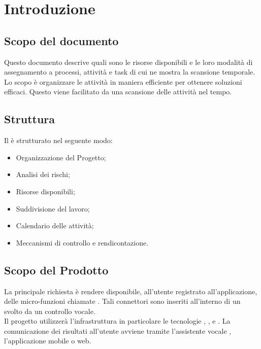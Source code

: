 \justify
\section{Introduzione}

\subsection{Scopo del documento}
Questo documento descrive quali sono le risorse disponibili e le loro modalità di assegnamento a processi, attività e task
di cui ne mostra la scansione temporale. 
Lo scopo è organizzare le attività in maniera efficiente per ottenere soluzioni efficaci. Questo viene facilitato
da una scansione delle attività nel tempo.

\subsection{Struttura}
Il \docNamePdP{} è strutturato nel seguente modo:
\begin{itemize}
    \item Organizzazione del Progetto;
    \item Analisi dei rischi;
    \item Risorse disponibili;
    \item Suddivisione del lavoro;
    \item Calendario delle attività;
    \item Meccanismi di controllo e rendicontazione.
\end{itemize}

\subsection{Scopo del Prodotto}
La principale richiesta è rendere disponibile, all’utente registrato all'applicazione, delle micro-funzioni chiamate .
Tali connettori sono inseriti all’interno di un  svolto da un controllo vocale. \\
Il progetto utilizzerà l’infrastruttura  in particolare le tecnologie , ,  e . La comunicazione dei risultati all’utente avviene tramite l’assistente vocale , l’applicazione mobile o web.

